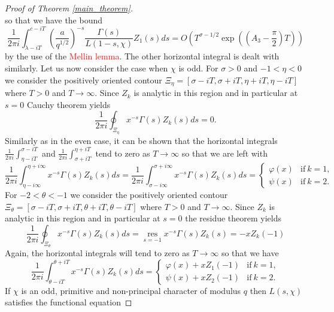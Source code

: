 \documentclass[11pt]{article}
\numberwithin{equation}{section}		 			%
\numberwithin{figure}{section}			 			%
\begin{document}
\begin{proof}[Proof of Theorem \eqref{main_theorem}]
\[\]
so that we have the bound
\[
\frac{1}
{{2\pi i}}\int_{\lambda  - iT}^{c - iT} {\left( {\frac{a}
{{q^{1/2} }}} \right)^{ - s} \frac{{\Gamma (s)}}
{{L(1 - s,\chi )}}Z_1 (s)ds}  = O\left( {T^{\sigma  - 1/2} \exp \left( {\left( {A_3  - \frac{\pi }
{2}} \right)T} \right)} \right)
\]
by the use of the \textcolor{red}{Mellin lemma}. The other horizontal integral is dealt with similarly. Let us now consider the case when $\chi$ is odd. For $\sigma > 0$ and $-1 < \eta < 0$ we consider the positively oriented contour $\Xi_\eta = [\sigma - iT, \sigma + iT, \eta +iT, \eta-iT]$ where $T>0$ and $T \to \infty$. Since $Z_k$ is analytic in this region and in particular at $s=0$ Cauchy theorem yields
\[
\frac{1}{{2\pi i}}\oint_{\Xi_\eta}  {x^{ - s} \Gamma (s)Z_k (s)ds}  = 0.
\]
Similarly as in the even case, it can be shown that the horizontal integrals $\tfrac{1}{{2\pi i}}\int_{\eta  - iT}^{\sigma  - iT}$ and $\tfrac{1}{{2\pi i}}\int_{\sigma  + iT}^{\eta  + iT}$ tend to zero as $T \to \infty$ so that we are left with
\begin{equation} \label{phi_psi_k_small_cases_eta_odd}
\frac{1}
{{2\pi i}}\int_{\eta  - i\infty }^{\eta  + i\infty } {x^{ - s} \Gamma (s)Z_k (s)ds}  = \frac{1}
{{2\pi i}}\int_{\sigma  - i\infty }^{\sigma  + i\infty } {x^{ - s} \Gamma (s)Z_k (s)ds}  =
			\begin{cases}
{\varphi (x)} & \mathrm{if\ } k=1, \\ 
{\psi (x)} & \mathrm{if\ } k=2. 
			\end{cases}
\end{equation}
For $- 2 < \theta  <  - 1$ we consider the positively oriented contour $\Xi_\theta = [\sigma - iT, \sigma + iT, \theta +iT, \theta-iT]$ where $T>0$ and $T \to \infty$. Since $Z_k$ is analytic in this region and in particular at $s=0$ the residue theorem yields
\[
\frac{1}
{{2\pi i}}\oint_{\Xi _\theta  } {x^{ - s} \Gamma (s)Z_k (s)ds}  = \mathop {\operatorname{res} }\limits_{s =  - 1} x^{ - s} \Gamma (s)Z_k (s) =  - xZ_k ( - 1)
\]
Again, the horizontal integrals will tend to zero as $T \to \infty$ so that we have
\begin{equation} \label{phi_psi_k_largel_cases_eta_odd}
\frac{1}
{{2\pi i}}\int_{\theta  - iT}^{\theta  + iT} {x^{ - s} \Gamma (s)Z_k (s)ds} = 
			\begin{cases}
{\varphi (x) + xZ_1(-1)} & \mathrm{if\ } k=1, \\ 
{\psi (x) + xZ_2(-1)} & \mathrm{if\ } k=2. 
			\end{cases}
\end{equation}
If $\chi$ is an odd, primitive and non-principal character of modulus $q$ then $L(s,\chi)$ satisfies the functional equation

\end{proof}
\end{document}
